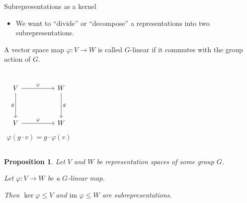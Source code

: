\documentclass[10pt]{beamer}
\newtheorem{proposition}{Proposition}[theorem]
\begin{document}
	\begin{frame}{Subrepresentations as a kernel}
		
		\begin{itemize}
			\item We want to ``divide'' or ``decompose'' a representations into two subrepresentations.
		\end{itemize}\pause
		
		\begin{definition}
			A vector space map $\varphi : V \rightarrow W$ is called $G$-linear if it commutes with the group action of $G$.
			\begin{columns}
				\[\begin{tikzcd}[ampersand replacement=\&]
					V \&\& W \\
					\\
					V \&\& W
					\arrow["\varphi", from=1-1, to=1-3]
					\arrow["g"', from=1-1, to=3-1]
					\arrow["g", from=1-3, to=3-3]
					\arrow["\varphi", from=3-1, to=3-3]
				\end{tikzcd}\]
				\begin{align*}
					\varphi(g \cdot v) = g \cdot \varphi(v)
				\end{align*}
			\end{columns}
		\end{definition}\pause
		
		\begin{proposition}
			Let $V$ and $W$ be representation spaces of some group $G$.
			
			Let $\varphi: V \rightarrow W$ be a $G$-linear map. \pause
			
			Then $\ker \varphi \leq V$ and $\text{im } \varphi \leq W$ are subrepresentations.
		\end{proposition}
	\end{frame}
\end{document}
